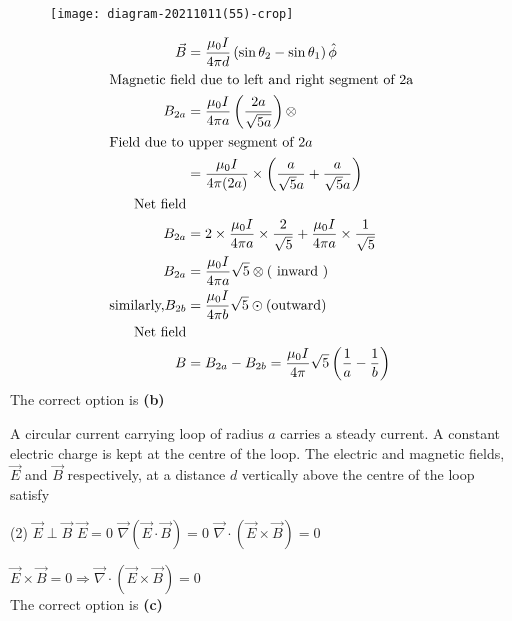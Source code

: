 \begin{enumerate}
\begin{answer}
	\begin{figure}[H]
		\centering
		\texttt{[image: diagram-20211011(55)-crop]}
	\end{figure}
	\begin{align*}
	\vec{B}&=\frac{\mu_{0} I}{4 \pi d}\left(\sin \theta_{2}-\sin \theta_{1}\right) \hat{\phi}\\
	\intertext{Magnetic field due to left and right segment of 2a}
	B_{2 a}&=\frac{\mu_{0} I}{4 \pi a}\left(\frac{2 a}{\sqrt{5 a}}\right) \otimes\\
	\intertext{Field due to upper segment of $2 a$}
	&=\frac{\mu_{0} I}{4 \pi(2 a)} \times\left(\frac{a}{\sqrt{5} a}+\frac{a}{\sqrt{5} a}\right)\\
	\text{Net field}\\
	B_{2 a}&=2 \times \frac{\mu_{0} I}{4 \pi a} \times \frac{2}{\sqrt{5}}+\frac{\mu_{0} I}{4 \pi a} \times \frac{1}{\sqrt{5}}\\
	B_{2 a}&=\frac{\mu_{0} I}{4 \pi a} \sqrt{5} \otimes(\text { inward })\\
	\text{similarly,} B_{2 b}&=\frac{\mu_{0} I}{4 \pi b} \sqrt{5} \odot \text{(outward)}\\
\text{	Net field}\\
 B&=B_{2 a}-B_{2 b}=\frac{\mu_{0} I}{4 \pi} \sqrt{5}\left(\frac{1}{a}-\frac{1}{b}\right)\\
	\end{align*}
	The correct option is \textbf{(b)}
\end{answer}
\begin{minipage}{\textwidth}
	\item A circular current carrying loop of radius $a$ carries a steady current. A constant electric charge is kept at the centre of the loop. The electric and magnetic fields, $\vec{E}$ and $\vec{B}$ respectively, at a distance $d$ vertically above the centre of the loop satisfy
\end{minipage}
\begin{tasks}(2)
	\task[\textbf{A.}] $\vec{E} \perp \vec{B}$
	\task[\textbf{B.}] $\vec{E}=0$
	\task[\textbf{C.}]$\vec{\nabla}(\vec{E} \cdot \vec{B})=0$
	\task[\textbf{D.}]$\vec{\nabla} \cdot(\vec{E} \times \vec{B})=0$
\end{tasks}
\begin{answer}
	$\vec{E} \times \vec{B}=0 \Rightarrow \vec{\nabla} \cdot(\vec{E} \times \vec{B})=0$\\
	The correct option is \textbf{(c)}
\end{answer}

\end{enumerate}
